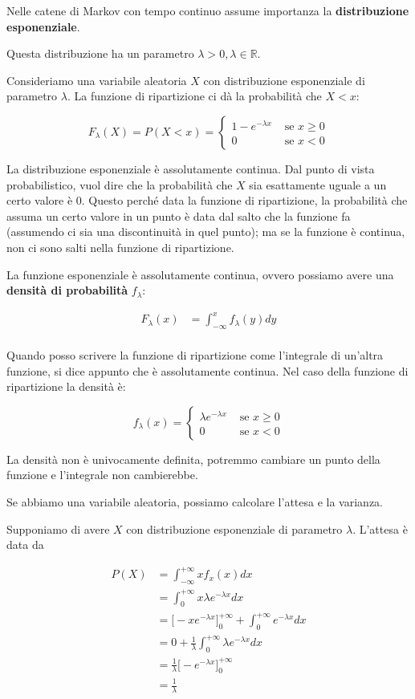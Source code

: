 \documentclass[a4paper,12pt]{book}
\begin{document}
Nelle catene di Markov con tempo continuo assume importanza la \textbf{distribuzione esponenziale}. 

Questa distribuzione ha un parametro $\lambda > 0, \lambda \in \mathbb{R}$. 

Consideriamo una variabile aleatoria $ X $ con distribuzione esponenziale di parametro $\lambda$. La funzione di ripartizione ci dà la probabilità che $ X < x $:

$$ F_\lambda (X) = P(X < x) = 
\begin{cases}
	1 - e^{ - \lambda x} & \text{ se } x \ge 0 \\
	0 & \text{ se } x < 0
\end{cases} $$

La distribuzione esponenziale è assolutamente continua. Dal punto di vista probabilistico, vuol dire che la probabilità che $ X $ sia esattamente uguale a un certo valore è 0. Questo perché data la funzione di ripartizione, la probabilità che assuma un certo valore in un punto è data dal salto che la funzione fa (assumendo ci sia una discontinuità in quel punto); ma se la funzione è continua, non ci sono salti nella funzione di ripartizione. 

La funzione esponenziale è assolutamente continua, ovvero possiamo avere una \textbf{densità di probabilità} $ f_\lambda $:

\begin{align*}
	F_\lambda (x) & = \int_{-\infty}^{x} f_\lambda(y)dy \\
\end{align*}

Quando posso scrivere la funzione di ripartizione come l'integrale di un'altra funzione, si dice appunto che è assolutamente continua. Nel caso della funzione di ripartizione la densità è:

$$ f_\lambda (x) = \begin{cases}
	\lambda e ^{-\lambda x} & \text{ se } x \ge 0 \\
	0 & \text{ se } x < 0
\end{cases} $$

La densità non è univocamente definita, potremmo cambiare un punto della funzione e l'integrale non cambierebbe. 

Se abbiamo una variabile aleatoria, possiamo calcolare l'attesa e la varianza. 

Supponiamo di avere $ X $ con distribuzione esponenziale di parametro $\lambda$. L'attesa è data da 

\begin{align*}
	P(X) & = \int_{-\infty}^{+\infty} x f_x(x) dx \\
	& = \int_{0}^{+\infty}x \lambda e ^{-\lambda x}dx \\
	& = \bigg[-xe^{-\lambda x} \bigg]_0^{+\infty} + \int_{0}^{+\infty} e ^{-\lambda x}dx  \\
	& = 0 + \frac{1}{\lambda}\int_{0}^{+\infty} \lambda e^{-\lambda x} dx \\
	& = \frac{1}{\lambda}\bigg[-e^{-\lambda x} \bigg]_0^{+\infty} \\
	& = \frac{1}{\lambda}
\end{align*}
\end{document}

